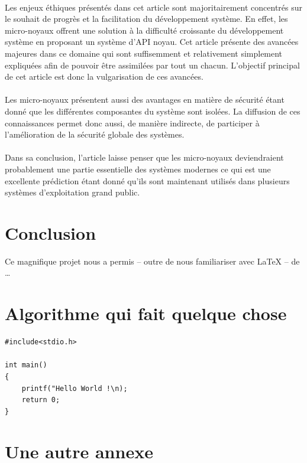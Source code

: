 \documentclass[a4paper, 12pt]{article}
\begin{document}
\paragraph{}
Les enjeux éthiques présentés dans cet article sont majoritairement concentrés sur le souhait de progrès et la facilitation du développement système. En effet, les micro-noyaux offrent une solution à la difficulté croissante du développement système en proposant un système d'API noyau. Cet article présente des avancées majeures dans ce domaine qui sont suffisemment et relativement simplement expliquées afin de pouvoir être assimilées par tout un chacun. L'objectif principal de cet article est donc la vulgarisation de ces avancées. \paragraph{}
Les micro-noyaux présentent aussi des avantages en matière de sécurité étant donné que les différentes composantes du système sont isolées. La diffusion de ces connaissances permet donc aussi, de manière indirecte, de participer à l'amélioration de la sécurité globale des systèmes.
\paragraph{}
Dans sa conclusion, l'article laisse penser que les micro-noyaux deviendraient probablement une partie essentielle des systèmes modernes ce qui est une excellente prédiction étant donné qu'ils sont maintenant utilisés dans plusieurs systèmes d'exploitation grand public.

\clearpage 
\section*{Conclusion}

Ce magnifique projet nous a permis -- outre de nous familiariser avec \LaTeX{} -- de \ldots

\clearpage 




\clearpage 
\appendix
\bigskip{}
\section{Algorithme qui fait quelque chose}
\begin{verbatim}
#include<stdio.h>

int main()
{
	printf("Hello World !\n);
	return 0;
}
\end{verbatim}

\clearpage 
\section{Une autre annexe}
\end{document}
